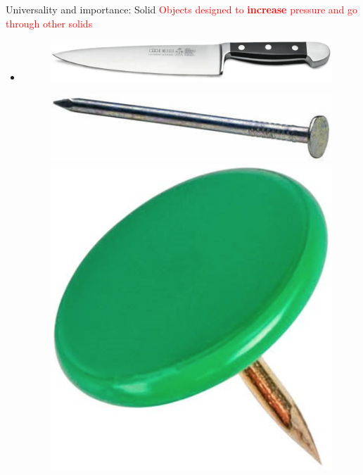 \documentclass[usenames,dvipsnames]{beamer}
\begin{document}
\begin{frame}{\huge{Universality and importance: Solid}}%
\textcolor{red}{Objects designed to \textbf{increase} pressure and go through other solids}
\begin{itemize}
\item[]
       \begin{figure}
           \centering
           \includegraphics[scale=0.4]{Images/knife.png}
       \end{figure}
       \begin{figure}
           \centering
           \includegraphics[scale=0.4]{Images/nail.png}\hspace{1cm}\includegraphics[scale=0.1]{Images/pin.png}

\end{figure}
\end{itemize}
\end{frame}
\end{document}
